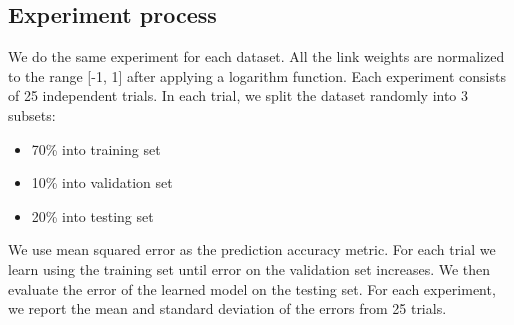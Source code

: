 \documentclass[book,12pt]{WSUThesis}
\theoremstyle{definition}
\begin{document}
\subsection{Experiment process}
We do the same experiment for each dataset.
All the link weights are normalized to the range [-1, 1] after applying a logarithm function.
Each experiment consists of 25 independent trials.
In each trial, we split the dataset randomly into 3 subsets:
\begin{itemize}
	\item 70\% into training set
	\item 10\% into validation set
	\item 20\% into testing set
\end{itemize}
We use mean squared error as the prediction accuracy metric.
For each trial we learn using the training set until error on the validation set increases. We then evaluate the error of the learned model on the testing set.
For each experiment, we report the mean and standard deviation of the errors from 25 trials.
\end{document}
